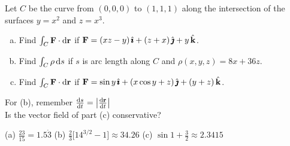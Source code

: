 

\begin{question}[M317 2001A] %
Let $C$ be the curve from $(0,0,0)$ to $(1,1,1)$ along the 
intersection of the surfaces $y=x^2$ and $z=x^3$.

\begin{enumerate}[(a)]
\item
Find $\int_C \mathbf{F}\cdot \mathrm{d}\mathbf{r}$ if
 $\mathbf{F}=(xz-y)\,\hat{\pmb{\imath}} + (z+x)\,\hat{\pmb{\jmath}}+ y\,\hat{\mathbf{k}}$.

\item
Find $\int_C \rho\, \mathrm{d}s$ if $s$ is arc length along $C$ and $\rho(x,y,z)=8x+36z$.

\item
Find $\int_C \mathbf{F}\cdot \mathrm{d}\mathbf{r}$ if
 $\mathbf{F}=\sin y\,\hat{\pmb{\imath}} + (x\cos y+z)\,\hat{\pmb{\jmath}}+ (y+z)\,\hat{\mathbf{k}}$.

\end{enumerate}
\end{question}

\begin{hint} 
For (b), remember $\diff{s}{t}=\left| \diff{\vr}{t}\right|$\\
Is the vector field of part (c) conservative?
\end{hint}

\begin{answer}
(a) $\frac{23}{15} = 1.5\dot 3$\qquad
(b) $\frac{2}{3}\big[14^{3/2}-1\big]\approx 34.26$\qquad
(c) $\sin 1+\frac{3}{2} \approx 2.3415$
\end{answer}


